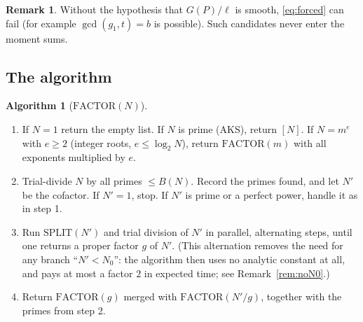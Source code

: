 \documentclass[11pt]{amsart}
\theoremstyle{definition}
\newtheorem{remark}[theorem]{Remark}
\newtheorem{algorithm}[theorem]{Algorithm}
\begin{document}
\begin{remark}
Without the hypothesis that $G(P)/\ell$ is smooth, \eqref{eq:forced} can fail (for example
$\gcd(g_1,t)=b$ is possible). Such candidates never enter the moment sums.
\end{remark}

\subsection{The algorithm}\label{sec:alg}

\begin{algorithm}[$\mathrm{FACTOR}(N)$]\label{alg:factor}
\begin{enumerate}[label=\arabic*.]
\item If $N=1$ return the empty list. If $N$ is prime (AKS), return $[N]$. If $N=m^e$ with $e\ge2$ (integer roots,
  $e\le\log_2N$), return $\mathrm{FACTOR}(m)$ with all exponents multiplied by $e$.
\item Trial-divide $N$ by all primes $\le B(N)$. Record the primes found, and let $N'$ be the cofactor. If $N'=1$,
  stop. If $N'$ is prime or a perfect power, handle it as in step 1.
\item Run $\mathrm{SPLIT}(N')$ and trial division of $N'$ in parallel, alternating steps, until one returns a
  proper factor $g$ of $N'$. (This alternation removes the need for any branch ``$N'<N_0$'': the algorithm then uses no analytic
  constant at all, and pays at most a factor $2$ in expected time; see Remark~\ref{rem:noN0}.)
\item Return $\mathrm{FACTOR}(g)$ merged with $\mathrm{FACTOR}(N'/g)$, together with the primes from step 2.
\end{enumerate}
\end{algorithm}
\end{document}
